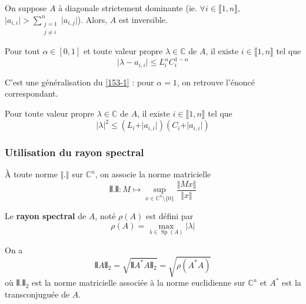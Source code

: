   \begin{corollary}
    On suppose $A$ à diagonale strictement dominante (ie. $\forall i \in \llbracket 1, n \rrbracket$, $\vert a_{i,i} \vert > \sum_{\substack{j=1 \\ j \neq i}}^n \vert a_{i,j} \vert$). Alors, $A$ est inversible.
  \end{corollary}
  
  \begin{theorem}[Ostrowski]
    Pour tout $\alpha \in [0,1]$ et toute valeur propre $\lambda \in \mathbb{C}$ de $A$, il existe $i \in \llbracket 1, n \rrbracket$ tel que
    \[ \vert \lambda - a_{i,i} \vert \leq L_i^{\alpha} C_i^{1-\alpha} \]
  \end{theorem}
  
  \begin{remark}
    C'est une généralisation du \cref{153-1} : pour $\alpha = 1$, on retrouve l'énoncé correspondant.
  \end{remark}
  
  \begin{corollary}
    Pour toute valeur propre $\lambda \in \mathbb{C}$ de $A$, il existe $i \in \llbracket 1, n \rrbracket$ tel que
    \[ \vert \lambda \vert^2 \leq (L_i + \vert a_{i,i} \vert) (C_i + \vert a_{i,i} \vert) \]
  \end{corollary}
  
  \subsubsection{Utilisation du rayon spectral}
  
  \begin{notation}
    À toute norme $\Vert . \Vert$ sur $\mathbb{C}^n$, on associe la norme matricielle
    \[ \VERT . \VERT : M \mapsto \sup_{x \in \mathbb{C}^n \setminus \{ 0 \}} \frac{\Vert Mx \Vert}{\Vert x \Vert} \]
  \end{notation}
  
  \begin{definition}
    Le \textbf{rayon spectral} de $A$, noté $\rho(A)$ est défini par
    \[ \rho(A) = \max_{\lambda \in \operatorname{Sp}(A)} \vert \lambda \vert \]
  \end{definition}
  
  \begin{theorem}
    On a
    \[ \VERT A \VERT_2 = \sqrt{\VERT A^* A \VERT_2} = \sqrt{\rho(A^* A)} \]
    où $\VERT . \VERT_2$ est la norme matricielle associée à la norme euclidienne sur $\mathbb{C}^n$ et $A^*$ est la transconjuguée de $A$.
  \end{theorem}
  
